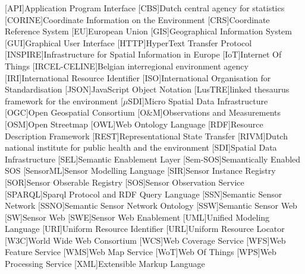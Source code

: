 
\begin{acronym}[UML]
  [API]{Application Program Interface}
  [CBS]{Dutch central agency for statistics}
  [CORINE]{Coordinate Information on the Environment}
  [CRS]{Coordinate Reference System} 
  [EU]{European Union}
  [GIS]{Geographical Information System}
  [GUI]{Graphical User Interface}
  [HTTP]{HyperText Transfer Protocol}
  [INSPIRE]{Infrastructure for Spatial Information in Europe}
  [IoT]{Internet Of Things}
  [IRCEL-CELINE]{Belgian interregional environment agency}
  [IRI]{International Resource Identifier}
  [ISO]{International Organisation for Standardisation}
  [JSON]{JavaScript Object Notation}
  [LusTRE]{linked thesaurus framework for the environment} 
  [$\mu$SDI]{Micro Spatial Data Infrastructure}
  [OGC]{Open Geospatial Consortium}
  [O\&M]{Observations and Measurements}
  [OSM]{Open Streetmap}
  [OWL]{Web Ontology Language}
  [RDF]{Resource Description Framework}
  [REST]{Representational State Transfer}
  [RIVM]{Dutch national institute for public health and the environment}
  [SDI]{Spatial Data Infrastructure}
  [SEL]{Semantic Enablement Layer}
  [Sem-SOS]{Semantically Enabled SOS}
  [SensorML]{Sensor Modelling Language}
  [SIR]{Sensor Instance Registry}
  [SOR]{Sensor Obserable Registry}
  [SOS]{Sensor Observation Service}
  [SPARQL]{Sparql Protocol and RDF Query Language}
  [SSN]{Semantic Sensor Network}
  [SSNO]{Semantic Sensor Network Ontology}
  [SSW]{Semantic Sensor Web}
  [SW]{Sensor Web}
  [SWE]{Sensor Web Enablement}
  [UML]{Unified Modeling Language}
  [URI]{Uniform Resource Identifier}
  [URL]{Uniform Resource Locator}
  [W3C]{World Wide Web Consortium}
  [WCS]{Web Coverage Service}
  [WFS]{Web Feature Service}
  [WMS]{Web Map Service}
  [WoT]{Web Of Things}
  [WPS]{Web Processing Service}
  [XML]{Extensible Markup Language}
\end{acronym}